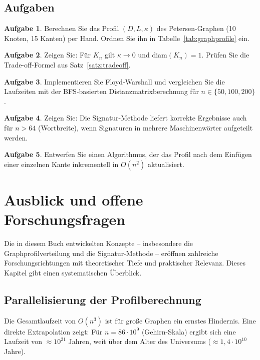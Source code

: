 ﻿\documentclass[a4paper,12pt,openany,oneside]{book}
\theoremstyle{definition}
\newtheorem{aufgabe}{Aufgabe}[chapter]
\theoremstyle{plain}
\theoremstyle{remark}
\begin{document}
\section{Aufgaben}

\begin{aufgabe}
  Berechnen Sie das Profil $(D, L, \kappa)$ des Petersen-Graphen (10 Knoten,
  15 Kanten) per Hand. Ordnen Sie ihn in Tabelle~\ref{tab:graphprofile} ein.
\end{aufgabe}

\begin{aufgabe}
  Zeigen Sie: F\"ur $K_n$ gilt $\kappa \to 0$ und $\mathrm{diam}(K_n)=1$.
  Pr\"ufen Sie die Trade-off-Formel aus Satz~\ref{satz:tradeoff}.
\end{aufgabe}

\begin{aufgabe}
  Implementieren Sie Floyd-Warshall und vergleichen Sie die Laufzeiten mit
  der BFS-basierten Distanzmatrixberechnung f\"ur $n \in \{50,100,200\}$.
\end{aufgabe}

\begin{aufgabe}
  Zeigen Sie: Die Signatur-Methode liefert korrekte Ergebnisse auch f\"ur
  $n > 64$ (Wortbreite), wenn Signaturen in mehrere Maschinenw\"orter
  aufgeteilt werden.
\end{aufgabe}

\begin{aufgabe}
  Entwerfen Sie einen Algorithmus, der das Profil nach dem Einf\"ugen einer
  einzelnen Kante inkrementell in $O(n^2)$ aktualisiert.
\end{aufgabe}
\chapter{Ausblick und offene Forschungsfragen}
\label{chap:ausblick}

Die in diesem Buch entwickelten Konzepte -- insbesondere die
Graphprofilverteilung und die Signatur-Methode -- er\"offnen zahlreiche
Forschungsrichtungen mit theoretischer Tiefe und praktischer Relevanz.
Dieses Kapitel gibt einen systematischen \"Uberblick.

\section{Parallelisierung der Profilberechnung}

Die Gesamtlaufzeit von $O(n^3)$ ist f\"ur gro\ss{}e Graphen ein ernstes
Hindernis. Eine direkte Extrapolation zeigt: F\"ur $n = 86 \cdot 10^9$
(Gehirn-Skala) ergibt sich eine Laufzeit von $\approx 10^{21}$ Jahren,
weit \"uber dem Alter des Universums ($\approx 1{,}4 \cdot 10^{10}$ Jahre).
\end{document}
